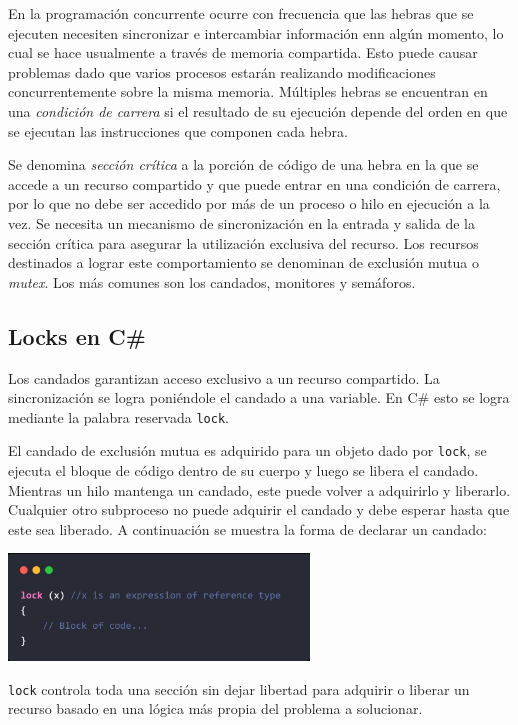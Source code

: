 \documentclass[10pt]{article} %
\newcommand{\csl}[1]{\colorbox{backcolour}{\texttt{#1}}}
\begin{document}
En la programaci\'on concurrente ocurre con frecuencia que las hebras que se ejecuten necesiten sincronizar e intercambiar informaci\'on enn alg\'un momento, lo cual se hace usualmente a trav\'es de memoria compartida. Esto puede causar problemas dado que varios procesos estar\'an realizando modificaciones concurrentemente sobre la misma memoria. M\'ultiples hebras se encuentran en una \textit{condici\'on de carrera} si el resultado de su ejecuci\'on depende del orden en que se ejecutan las instrucciones que componen cada hebra. 

Se denomina \textit{sección crítica} a la porción de código de una hebra en la que se accede a un recurso compartido y que puede entrar en una condici\'on de carrera, por lo que no debe ser accedido por más de un proceso o hilo en ejecución a la vez. Se necesita un mecanismo de sincronización en la entrada y salida de la sección crítica para asegurar la utilización exclusiva del recurso. Los recursos destinados a lograr este comportamiento se denominan de exclusi\'on mutua o \textit{mutex}. Los m\'as comunes son los candados, monitores y semáforos.

\subsection{Locks en C\#}

Los candados garantizan acceso exclusivo a un recurso compartido. La sincronizaci\'on se logra poni\'endole el candado a una variable. En C\# esto se logra mediante la palabra reservada \csl{lock}. 

El candado de exclusi\'on mutua es adquirido para un objeto dado por \csl{lock}, se ejecuta el bloque de c\'odigo dentro de su cuerpo y luego se libera el candado. Mientras un hilo mantenga un candado, este puede volver a adquirirlo y liberarlo. Cualquier otro subproceso no puede adquirir el candado y debe esperar hasta que este sea liberado. A continuaci\'on se muestra la forma de declarar un candado:

\begin{center}
	\includegraphics[width=8cm]{lock.jpg}
\end{center}

\csl{lock} controla toda una secci\'on sin dejar libertad para adquirir o liberar un recurso basado en una l\'ogica m\'as propia del problema a solucionar. 
\end{document}
